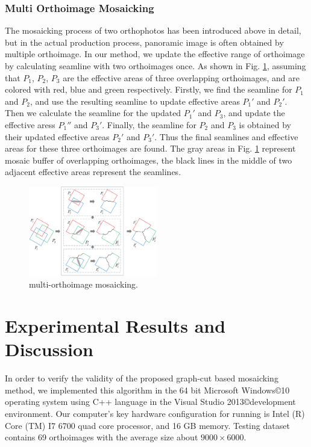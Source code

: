 \documentclass[journal]{IEEEtran}
\begin{document}
\subsubsection{Multi Orthoimage Mosaicking}
The mosaicking process of two orthophotos has been introduced above in detail, but in the actual production process, panoramic image is often obtained by multiple orthoimage. In our method, we update the effective range of orthoimage by calculating seamline with two orthoimages once. As shown in Fig. \ref{fig:multi-orthoimage-mosaic}, assuming that $P_1$, $P_2$, $P_3$ are the effective areas of three overlapping orthoimages, and are colored  with red, blue and green respectively. Firstly, we find the seamline for $P_1$ and $P_2$, and use the resulting seamline to update effective areas ${P_1}'$ and ${P_2}'$. Then we calculate the seamline for the updated ${P_1}'$ and $P_3$, and update the effective aress ${P_1}''$ and ${P_3}'$. Finally, the seamline for $P_2$ and $P_3$ is obtained by their updated effective areas ${P_2}'$ and ${P_3}'$. Thus the final seamlines and effective areas for these three orthoimages are found. The gray areas in Fig. \ref{fig:multi-orthoimage-mosaic} represent mosaic buffer of overlapping orthoimages, the black lines in the middle of two adjacent effective areas represent the seamlines.
\begin{figure}[!t]
	\centering
	\includegraphics[width=0.5\textwidth]{mosaicking}
	\caption{multi-orthoimage mosaicking.}
	\label{fig:multi-orthoimage-mosaic}
\end{figure}

\section{Experimental Results and Discussion}
In order to verify the validity of the proposed graph-cut based mosaicking method, we implemented this algorithm in the 64 bit Microsoft Windows\copyright 10 operating system using C++ language in the Visual Studio 2013\copyright development environment. Our computer's key hardware configuration for running is Intel (R) Core (TM) I7 6700 quad core processor, and 16 GB memory. Testing dataset contains 69 orthoimages with the average size about $9000\times 6000$.
\end{document}
